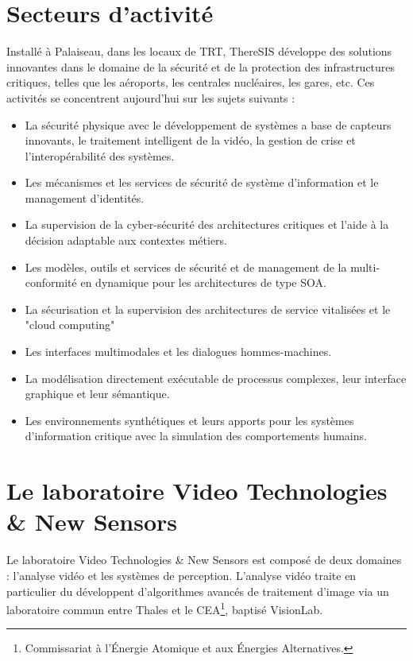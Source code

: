 \section{Secteurs d’activit\'e}

Install\'e à Palaiseau, dans les locaux de TRT, ThereSIS d\'eveloppe des solutions innovantes dans le domaine de la s\'ecurit\'e et de la protection des infrastructures critiques, telles que les a\'eroports, les centrales nucl\'eaires, les gares, etc. Ces activit\'es se concentrent aujourd’hui sur les sujets suivants :

\begin{itemize}
  \item La s\'ecurit\'e physique avec le d\'eveloppement de systèmes a base de capteurs innovants, le traitement intelligent de la vid\'eo, la gestion de crise et l’interop\'erabilit\'e des systèmes.
  \item Les m\'ecanismes et les services de s\'ecurit\'e de système d’information et le management d’identit\'es.
  \item La supervision de la cyber-s\'ecurit\'e des architectures critiques et l’aide à la d\'ecision adaptable aux contextes m\'etiers.
  \item Les modèles, outils et services de s\'ecurit\'e et de management de la multi-conformit\'e en dynamique pour les architectures de type SOA.
  \item La s\'ecurisation et la supervision des architectures de service vitalis\'ees et le "cloud computing"
  \item Les interfaces multimodales et les dialogues hommes-machines.
  \item La mod\'elisation directement ex\'ecutable de processus complexes, leur interface graphique et leur s\'emantique.
  \item Les environnements synth\'etiques et leurs apports pour les systèmes d’information critique avec la simulation des comportements humains.
\end{itemize}

\section{Le laboratoire Video Technologies \& New Sensors}

Le laboratoire Video Technologies \& New Sensors est compos\'e de deux domaines : l'analyse vid\'eo et les syst\`emes de perception. L'analyse vid\'eo traite en particulier du d\'eveloppent d'algorithmes avanc\'es de traitement d'image via un laboratoire commun entre Thales et le CEA\footnote{Commissariat \`a l'\'Energie Atomique et aux \'Energies Alternatives.}, baptis\'e VisionLab.
